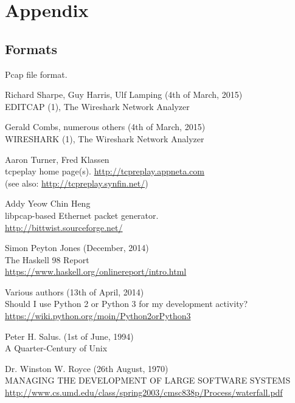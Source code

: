 \documentclass[10pt,a4paper,notitlepage]{report}
\begin{document}
\chapter{Appendix}
\section{Formats}
Pcap file format.



\begin{thebibliography}{99}
    Richard Sharpe, Guy Harris, Ulf Lamping (4th of March, 2015)\\
    EDITCAP (1), The Wireshark Network Analyzer

    Gerald Combs, numerous others (4th of March, 2015)\\
    WIRESHARK (1), The Wireshark Network Analyzer

    Aaron Turner, Fred Klassen\\
    tcpeplay home page(s).
    \url{http://tcpreplay.appneta.com}\\
    (see also: \url{http://tcpreplay.synfin.net/})

    Addy Yeow Chin Heng\\
    libpcap-based Ethernet packet generator.\\
    \url{http://bittwist.sourceforge.net/}

    Simon Peyton Jones (December, 2014)\\
    The Haskell 98 Report\\
    \url{https://www.haskell.org/onlinereport/intro.html}

    Various authors (13th of April, 2014)\\
    Should I use Python 2 or Python 3 for my development activity?\\
    \url{https://wiki.python.org/moin/Python2orPython3}

    Peter H. Salus. (1st of June, 1994)\\
    A Quarter-Century of Unix

    Dr. Winston W. Royce (26th August, 1970)\\
    MANAGING THE DEVELOPMENT OF LARGE SOFTWARE SYSTEMS\\
    \url{http://www.cs.umd.edu/class/spring2003/cmsc838p/Process/waterfall.pdf}
\end{thebibliography}
\end{document}
